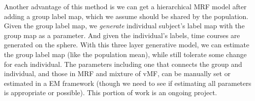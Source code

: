 \documentclass[12pt]{article}
\begin{document}
Another advantage of this method is we can get a hierarchical MRF model after adding a group label map, which we assume should be shared by the population. Given the group label map, we \emph{generate} individual subject's label map with the group map as a parameter. And given the individual's labels, time courses  are generated on the sphere. With this three layer generative model, we can estimate the group label map (like the population mean), while still tolerate some change for each individual. The parameters including one that connects the group and individual, and those in MRF and mixture of vMF, can be manually set or estimated in a EM framework (though we need to see if estimating all parameters is appropriate or possible). This portion of work is an ongoing project.

 

\end{document}
